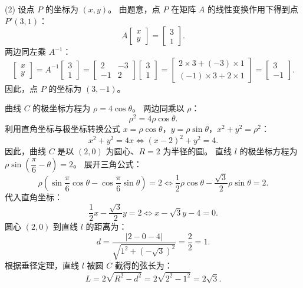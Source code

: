 \begin{answer}
(2) 设点 $P$ 的坐标为 $(x, y)$。
由题意，点 $P$ 在矩阵 $A$ 的线性变换作用下得到点 $P'(3, 1)$：
\nopagebreak[4]
\[A \begin{bmatrix} x \\ y \end{bmatrix} = \begin{bmatrix} 3 \\ 1 \end{bmatrix}.\]
两边同左乘 $A^{-1}$：
\nopagebreak[4]
\[\begin{bmatrix} x \\ y \end{bmatrix} = A^{-1} \begin{bmatrix} 3 \\ 1 \end{bmatrix} = \begin{bmatrix} 2 & -3 \\ -1 & 2 \end{bmatrix} \begin{bmatrix} 3 \\ 1 \end{bmatrix} = \begin{bmatrix} 2 \times 3 + (-3) \times 1 \\ (-1) \times 3 + 2 \times 1 \end{bmatrix} = \begin{bmatrix} 3 \\ -1 \end{bmatrix}.\]
因此，点 $P$ 的坐标为 $(3, -1)$。

曲线 $C$ 的极坐标方程为 $\rho = 4\cos\theta$。
两边同乘以 $\rho$：
\nopagebreak[4]
\[\rho^2 = 4\rho\cos\theta.\]
利用直角坐标与极坐标转换公式 $x = \rho\cos\theta$，$y = \rho\sin\theta$，$x^2 + y^2 = \rho^2$：
\nopagebreak[4]
\[x^2 + y^2 = 4x \iff (x - 2)^2 + y^2 = 4.\]
因此，曲线 $C$ 是以 $(2, 0)$ 为圆心、$R = 2$ 为半径的圆。
直线 $l$ 的极坐标方程为 $\rho\sin\left(\dfrac{\pi}{6} - \theta\right) = 2$。
展开三角公式：
\nopagebreak[4]
\[\rho\left(\sin\frac{\pi}{6}\cos\theta - \cos\frac{\pi}{6}\sin\theta\right) = 2 \iff \frac{1}{2}\rho\cos\theta - \frac{\sqrt{3}}{2}\rho\sin\theta = 2.\]
代入直角坐标：
\nopagebreak[4]
\[\frac{1}{2}x - \frac{\sqrt{3}}{2}y = 2 \iff x - \sqrt{3}y - 4 = 0.\]
圆心 $(2, 0)$ 到直线 $l$ 的距离为：
\nopagebreak[4]
\[d = \frac{|2 - 0 - 4|}{\sqrt{1^2 + (-\sqrt{3})^2}} = \frac{2}{2} = 1.\]
根据垂径定理，直线 $l$ 被圆 $C$ 截得的弦长为：
\nopagebreak[4]
\[L = 2\sqrt{R^2 - d^2} = 2\sqrt{2^2 - 1^2} = 2\sqrt{3}.\]


\end{answer}
